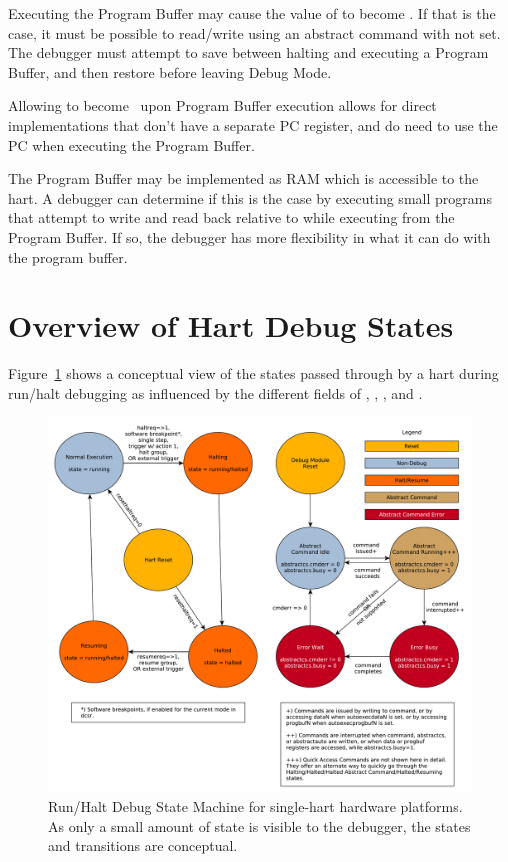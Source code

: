 Executing the Program Buffer may cause the value of \RcsrDpc to become \unspecified. If that is the case, it must be
possible to read/write \RcsrDpc using an abstract command with \FacAccessregisterPostexec not set.
The debugger must attempt to save \RcsrDpc between halting and
executing a Program Buffer, and then restore \RcsrDpc before leaving Debug Mode.

\begin{commentary}
    Allowing \RcsrDpc to become \unspecified\ upon Program Buffer execution
    allows for direct
    implementations that don't have a separate PC register, and do need to use
    the PC when executing the Program Buffer.
\end{commentary}

The Program Buffer may be implemented as RAM which is accessible to the
hart. A debugger can determine if this is the case by executing small
programs that attempt to write and read back relative to \Rpc while executing
from the Program Buffer.
If so, the debugger has more flexibility in what it can do with the program buffer.

\section{Overview of Hart Debug States}

Figure~\ref{fig:abstract_sm} shows a conceptual view of the states
passed through by a hart during run/halt debugging as influenced
by the different fields of \RdmDmcontrol, \RdmAbstractcs, \RdmAbstractauto, and
\RdmCommand.

\begin{figure}
   \centering
   \includegraphics[width=\textwidth]{fig/abstract_commands.pdf}
   \caption[Run/Halt Debug State Machine]{Run/Halt Debug State Machine for single-hart hardware platforms.
     As only a small amount of state is visible to the debugger,
     the states and transitions are conceptual.}
   \label{fig:abstract_sm}
\end{figure}

